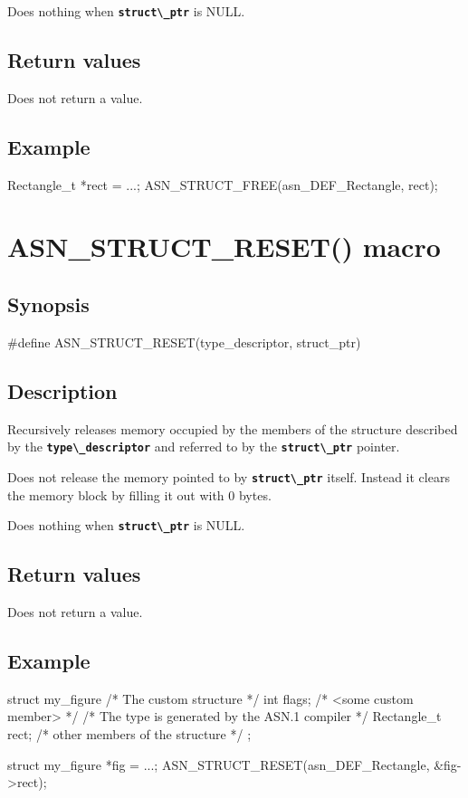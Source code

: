 \documentclass[english,oneside,12pt]{book}
\newcommand{\apisection}[2]{\clearpage\section{\label{#1}#2}}
\newcommand{\code}[1]{\texttt{\textbf{\lstinline{#1}}}}
\begin{document}
Does nothing when \code{struct\_ptr} is NULL.

\subsection*{Return values}
Does not return a value.

\subsection*{Example}

\begin{example}
Rectangle_t *rect = ...;
ASN_STRUCT_FREE(asn_DEF_Rectangle, rect);
\end{example}

\apisection{sec:ASN_STRUCT_RESET}{ASN\_STRUCT\_RESET() macro}

\subsection*{Synopsis}

\begin{signature}
#define ASN_STRUCT_RESET(type_descriptor, struct_ptr)
\end{signature}

\subsection*{Description}

Recursively releases memory occupied by the members of the structure
described by the \code{type\_descriptor} and referred to
by the \code{struct\_ptr} pointer.

Does not release the memory pointed to by \code{struct\_ptr} itself.
Instead it clears the memory block by filling it out with 0 bytes.

Does nothing when \code{struct\_ptr} is NULL.

\subsection*{Return values}
Does not return a value.

\subsection*{Example}

\begin{example}
struct my_figure {       /* The custom structure */
    int flags;           /* <some custom member> */
    /* The type is generated by the ASN.1 compiler */
    Rectangle_t rect;
    /* other members of the structure */
};

struct my_figure *fig = ...;
ASN_STRUCT_RESET(asn_DEF_Rectangle, &fig->rect);
\end{example}
\end{document}
